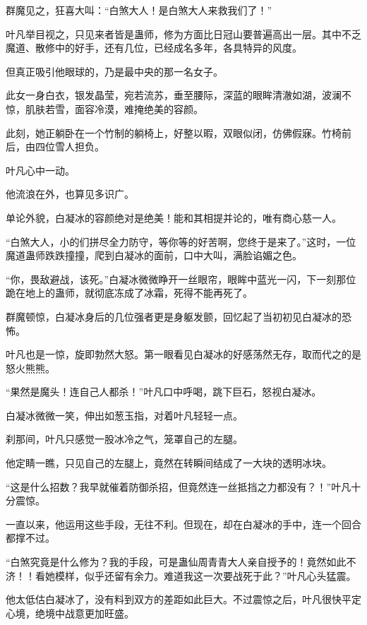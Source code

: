 \begin{this_body}
群魔见之，狂喜大叫：“白煞大人！是白煞大人来救我们了！”

叶凡举目视之，只见来者皆是蛊师，修为方面比日冠山要普遍高出一层。其中不乏魔道、散修中的好手，还有几位，已经成名多年，各具特异的风度。

但真正吸引他眼球的，乃是最中央的那一名女子。

此女一身白衣，银发晶莹，宛若流苏，垂至腰际，深蓝的眼眸清澈如湖，波澜不惊，肌肤若雪，面容冷漠，难掩绝美的容颜。

此刻，她正躺卧在一个竹制的躺椅上，好整以暇，双眼似闭，仿佛假寐。竹椅前后，由四位雪人担负。

叶凡心中一动。

他流浪在外，也算见多识广。

单论外貌，白凝冰的容颜绝对是绝美！能和其相提并论的，唯有商心慈一人。

“白煞大人，小的们拼尽全力防守，等你等的好苦啊，您终于是来了。”这时，一位魔道蛊师跌跌撞撞，爬到白凝冰的面前，口中大叫，满脸谄媚之色。

“你，畏敌避战，该死。”白凝冰微微睁开一丝眼帘，眼眸中蓝光一闪，下一刻那位跪在地上的蛊师，就彻底冻成了冰霜，死得不能再死了。

群魔顿惊，白凝冰身后的几位强者更是身躯发颤，回忆起了当初初见白凝冰的恐怖。

叶凡也是一惊，旋即勃然大怒。第一眼看见白凝冰的好感荡然无存，取而代之的是怒火熊熊。

“果然是魔头！连自己人都杀！”叶凡口中呼喝，跳下巨石，怒视白凝冰。

白凝冰微微一笑，伸出如葱玉指，对着叶凡轻轻一点。

刹那间，叶凡只感觉一股冰冷之气，笼罩自己的左腿。

他定睛一瞧，只见自己的左腿上，竟然在转瞬间结成了一大块的透明冰块。

“这是什么招数？我早就催着防御杀招，但竟然连一丝抵挡之力都没有？！”叶凡十分震惊。

一直以来，他运用这些手段，无往不利。但现在，却在白凝冰的手中，连一个回合都撑不过。

“白煞究竟是什么修为？我的手段，可是蛊仙周青青大人亲自授予的！竟然如此不济！！看她模样，似乎还留有余力。难道我这一次要战死于此？”叶凡心头猛震。

他太低估白凝冰了，没有料到双方的差距如此巨大。不过震惊之后，叶凡很快平定心境，绝境中战意更加旺盛。

\end{this_body}

